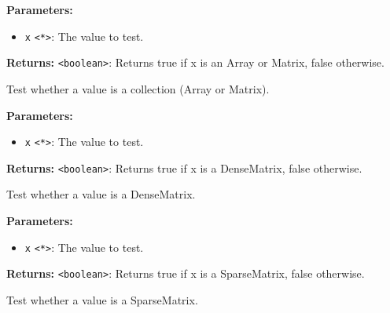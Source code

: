 \documentclass[12pt,a4paper]{article}
\begin{document}
\vspace{5mm}
\noindent {}


\noindent \textbf{Parameters:}
\begin{itemize}
  \item \texttt{x} \texttt{<*>}: The value to test.
\end{itemize}

\noindent \textbf{Returns:} \texttt{<boolean>}: Returns true if \textasciigrave{}x\textasciigrave{} is an Array or Matrix, false otherwise.

\noindent Test whether a value is a collection (Array or Matrix).

\vspace{5mm}
\noindent {}


\noindent \textbf{Parameters:}
\begin{itemize}
  \item \texttt{x} \texttt{<*>}: The value to test.
\end{itemize}

\noindent \textbf{Returns:} \texttt{<boolean>}: Returns true if \textasciigrave{}x\textasciigrave{} is a DenseMatrix, false otherwise.

\noindent Test whether a value is a DenseMatrix.

\vspace{5mm}
\noindent {}


\noindent \textbf{Parameters:}
\begin{itemize}
  \item \texttt{x} \texttt{<*>}: The value to test.
\end{itemize}

\noindent \textbf{Returns:} \texttt{<boolean>}: Returns true if \textasciigrave{}x\textasciigrave{} is a SparseMatrix, false otherwise.

\noindent Test whether a value is a SparseMatrix.

\vspace{5mm}
\noindent {}
\end{document}
